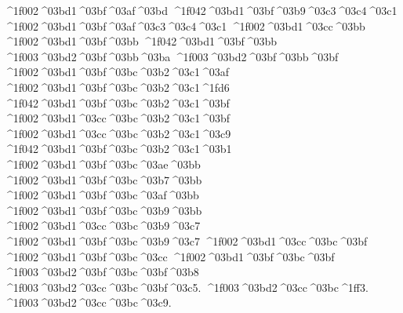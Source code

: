 {^^^^1f002^^^^03bd1^^^^03bf^^^^03af^^^^03bd
^^^^1f042^^^^03bd1^^^^03bf^^^^03b9^^^^03c3^^^^03c4^^^^03c1 		%
^^^^1f002^^^^03bd1^^^^03bf^^^^03af^^^^03c3^^^^03c4^^^^03c1
^^^^1f002^^^^03bd1^^^^03cc^^^^03bb    		%
^^^^1f002^^^^03bd1^^^^03bf^^^^03bb
^^^^1f042^^^^03bd1^^^^03bf^^^^03bb    		%
	^^^^1f003^^^^03bd2^^^^03bf^^^^03bb^^^^03ba  		%
	^^^^1f003^^^^03bd2^^^^03bf^^^^03bb^^^^03bf  		%
^^^^1f002^^^^03bd1^^^^03bf^^^^03bc^^^^03b2^^^^03c1^^^^03af 		%
^^^^1f002^^^^03bd1^^^^03bf^^^^03bc^^^^03b2^^^^03c1^^^^1fd6
^^^^1f042^^^^03bd1^^^^03bf^^^^03bc^^^^03b2^^^^03c1^^^^03bf		%
^^^^1f002^^^^03bd1^^^^03cc^^^^03bc^^^^03b2^^^^03c1^^^^03bf
^^^^1f002^^^^03bd1^^^^03cc^^^^03bc^^^^03b2^^^^03c1^^^^03c9
^^^^1f042^^^^03bd1^^^^03bf^^^^03bc^^^^03b2^^^^03c1^^^^03b1
^^^^1f002^^^^03bd1^^^^03bf^^^^03bc^^^^03ae^^^^03bb  		%
^^^^1f002^^^^03bd1^^^^03bf^^^^03bc^^^^03b7^^^^03bb
^^^^1f002^^^^03bd1^^^^03bf^^^^03bc^^^^03af^^^^03bb 		%
^^^^1f002^^^^03bd1^^^^03bf^^^^03bc^^^^03b9^^^^03bb
^^^^1f002^^^^03bd1^^^^03cc^^^^03bc^^^^03b9^^^^03c7 		%
^^^^1f002^^^^03bd1^^^^03bf^^^^03bc^^^^03b9^^^^03c7
^^^^1f002^^^^03bd1^^^^03cc^^^^03bc^^^^03bf		%
^^^^1f002^^^^03bd1^^^^03bf^^^^03bc^^^^03cc
^^^^1f002^^^^03bd1^^^^03bf^^^^03bc^^^^03bf    		%
	^^^^1f003^^^^03bd2^^^^03bf^^^^03bc^^^^03bf^^^^03b8 		%
	^^^^1f003^^^^03bd2^^^^03cc^^^^03bc^^^^03bf^^^^03c5. 		%
	^^^^1f003^^^^03bd2^^^^03cc^^^^03bc^^^^1ff3.
	^^^^1f003^^^^03bd2^^^^03cc^^^^03bc^^^^03c9.
}
